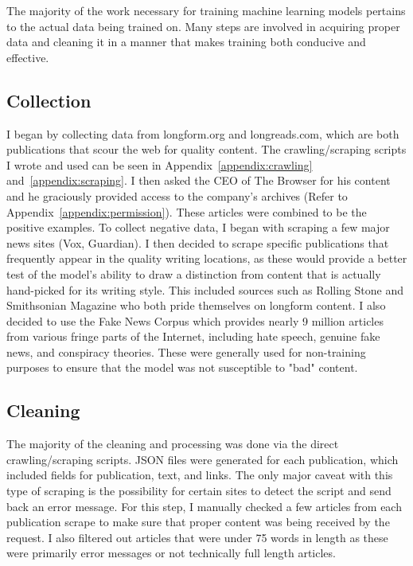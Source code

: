 The majority of the work necessary for training machine learning models pertains to the actual data being trained on. Many steps are involved in acquiring proper data and cleaning it in a manner that makes training both conducive and effective.

\subsection{Collection}
I began by collecting data from longform.org and longreads.com, which are both publications that scour the web for quality content. The crawling/scraping scripts I wrote and used can be seen in Appendix~\ref{appendix:crawling} and~\ref{appendix:scraping}. I then asked the CEO of The Browser for his content and he graciously provided access to the company’s archives (Refer to Appendix~\ref{appendix:permission}). These articles were combined to be the positive examples. To collect negative data, I began with scraping a few major news sites (Vox, Guardian). I then decided to scrape specific publications that frequently appear in the quality writing locations, as these would provide a better test of the model’s ability to draw a distinction from content that is actually hand-picked for its writing style. This included sources such as Rolling Stone and Smithsonian Magazine who both pride themselves on longform content. I also decided to use the Fake News Corpus which provides nearly 9 million articles from various fringe parts of the Internet, including hate speech, genuine fake news, and conspiracy theories. These were generally used for non-training purposes to ensure that the model was not susceptible to "bad" content.

\subsection{Cleaning}
The majority of the cleaning and processing was done via the direct crawling/scraping scripts. JSON files were generated for each publication, which included fields for publication, text, and links. The only major caveat with this type of scraping is the possibility for certain sites to detect the script and send back an error message. For this step, I manually checked a few articles from each publication scrape to make sure that proper content was being received by the request. I also filtered out articles that were under 75 words in length as these were primarily error messages or not technically full length articles.


